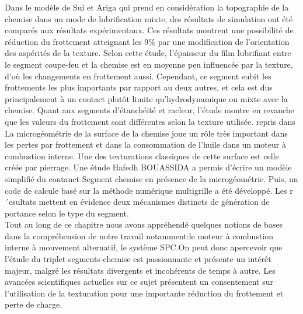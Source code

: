 Dans le modèle de Sui et Ariga qui prend en considération la topographie de la chemise dans un mode de lubrification mixte, des résultats de simulation ont été comparés aux résultats expérimentaux. Ces résultats montrent une possibilité de réduction du frottement atteignant les $9\%$ par une modification de l’orientation des aspérités de la texture. Selon cette étude, l’épaisseur du film lubrifiant entre le segment coupe-feu et la chemise est en moyenne peu influencée par la texture, d’où les changements en frottement aussi. Cependant, ce segment subit les frottements les plus importants par rapport au deux autres, et cela est dus principalement à un contact plutôt limite qu’hydrodynamique ou mixte avec la chemise. Quant aux segments d’étanchéité et racleur, l’étude montre en revanche que les valeurs du frottement sont différentes selon la texture utilisée. repris dans \cite{ayad2}\\

La microgéométrie de la surface de la chemise joue un rôle très important dans les pertes par
frottement et dans la consommation de l’huile dans un moteur à combustion interne. Une
des texturations classiques de cette surface est celle créée par pierrage. Une étude Hafedh BOUASSIDA a permis d'écrire un modèle simplifié du contanct Segment chemise en présence de la microgéométrie. Puis, un code de calcule basé sur la méthode numérique multigrille a été développé. Les r´esultats mettent en évidence deux mécanismes distincts de génération de portance selon le type du segment.\cite{hafedh}\\

Tout au long de ce chapitre nous avons appréhendé quelques notions de bases dans la compréhension de notre travail notamment:le   moteur à combustion interne à mouvement alternatif, le système SPC.On peut donc apercevoir que l’étude du triplet segments-chemise est passionnante et présente un intérêt majeur, malgré les résultats divergents et incohérents de temps à autre. Les avancées scientifiques actuelles sur ce sujet présentent un consentement sur l’utilisation de la texturation pour une importante réduction du frottement et perte de charge. 
